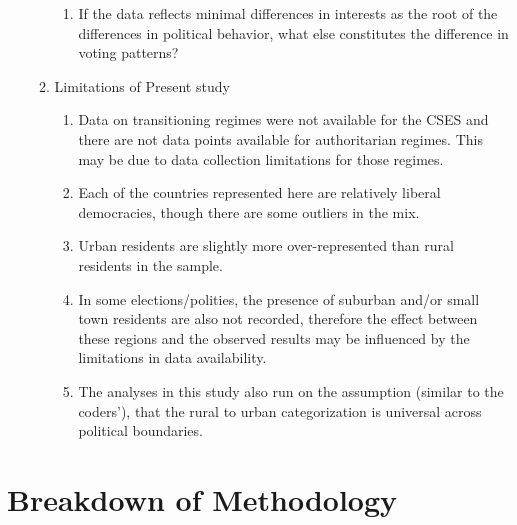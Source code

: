 \documentclass[12pt]{article}
\begin{document}
\begin{enumerate}
\begin{enumerate}
\begin{enumerate}
		\item If the data reflects minimal differences in interests as the root of the differences in political behavior, what else constitutes the difference in voting patterns?
	\end{enumerate}
	\item Limitations of Present study
	\begin{enumerate}
		\item Data on transitioning regimes were not available for the CSES and there are not data points available for authoritarian regimes. This may be due to data collection limitations for those regimes. 
		\item Each of the countries represented here are relatively liberal democracies, though there are some outliers in the mix. 
		\item Urban residents are slightly more over-represented than rural residents in the sample.
		\item In some elections/polities, the presence of suburban and/or small town residents are also not recorded, therefore the effect between these regions and the observed results may be influenced by the limitations in data availability. 
		\item The analyses in this study also run on the assumption (similar to the coders'), that the rural to urban categorization is universal across political boundaries.
	\end{enumerate}
\end{enumerate}
\end{enumerate}

\section{Breakdown of Methodology}
\end{document}
